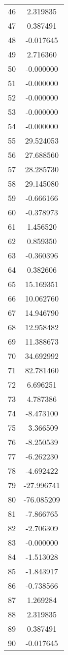 \documentclass[12pt]{article}
\begin{document}
\begin{longtable}{@{}cc@{}}
46 & 2.319835 \\
47 & 0.387491 \\
48 & -0.017645 \\
49 & 2.716360 \\
50 & -0.000000 \\
51 & -0.000000 \\
52 & -0.000000 \\
53 & -0.000000 \\
54 & -0.000000 \\
55 & 29.524053 \\
56 & 27.688560 \\
57 & 28.285730 \\
58 & 29.145080 \\
59 & -0.666166 \\
60 & -0.378973 \\
61 & 1.456520 \\
62 & 0.859350 \\
63 & -0.360396 \\
64 & 0.382606 \\
65 & 15.169351 \\
66 & 10.062760 \\
67 & 14.946790 \\
68 & 12.958482 \\
69 & 11.388673 \\
70 & 34.692992 \\
71 & 82.781460 \\
72 & 6.696251 \\
73 & 4.787386 \\
74 & -8.473100 \\
75 & -3.366509 \\
76 & -8.250539 \\
77 & -6.262230 \\
78 & -4.692422 \\
79 & -27.996741 \\
80 & -76.085209 \\
81 & -7.866765 \\
82 & -2.706309 \\
83 & -0.000000 \\
84 & -1.513028 \\
85 & -1.843917 \\
86 & -0.738566 \\
87 & 1.269284 \\
88 & 2.319835 \\
89 & 0.387491 \\
90 & -0.017645 \\

\end{longtable}
\end{document}
